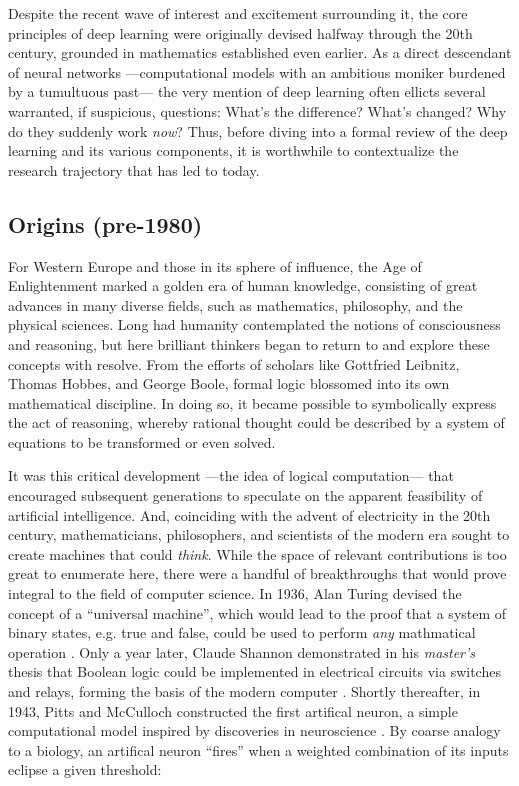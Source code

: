 Despite the recent wave of interest and excitement surrounding it, the core principles of deep learning were originally devised halfway through the 20th century, grounded in mathematics established even earlier.
As a direct descendant of neural networks ---computational models with an ambitious moniker burdened by a tumultuous past--- the very mention of deep learning often ellicts several warranted, if suspicious, questions: What's the difference? What's changed? Why do they suddenly work \emph{now}?
Thus, before diving into a formal review of the deep learning and its various components, it is worthwhile to contextualize the research trajectory that has led to today.


\subsection{Origins (pre-1980)}
\label{subsec:origins}

For Western Europe and those in its sphere of influence, the Age of Enlightenment marked a golden era of human knowledge, consisting of great advances in many diverse fields, such as mathematics, philosophy, and the physical sciences.
Long had humanity contemplated the notions of consciousness and reasoning, but here brilliant thinkers began to return to and explore these concepts with resolve.
From the efforts of scholars like Gottfried Leibnitz, Thomas Hobbes, and George Boole, formal logic blossomed into its own mathematical discipline.
In doing so, it became possible to symbolically express the act of reasoning, whereby rational thought could be described by a system of equations to be transformed or even solved.

It was this critical development ---the idea of logical computation--- that encouraged subsequent generations to speculate on the apparent feasibility of artificial intelligence.
And, coinciding with the advent of electricity in the 20th century, mathematicians, philosophers, and scientists of the modern era sought to create machines that could \emph{think}.
While the space of relevant contributions is too great to enumerate here, there were a handful of breakthroughs that would prove integral to the field of computer science.
In 1936, Alan Turing devised the concept of a ``universal machine'', which would lead to the proof that a system of binary states, e.g. true and false, could be used to perform \emph{any} mathmatical operation \cite{Turing1936}.
Only a year later, Claude Shannon demonstrated in his \emph{master's} thesis that Boolean logic could be implemented in electrical circuits via switches and relays, forming the basis of the modern computer \cite{Shannon1937}.
Shortly thereafter, in 1943, Pitts and McCulloch constructed the first artifical neuron, a simple computational model inspired by discoveries in neuroscience \cite{Pitts1943}.
By coarse analogy to a biology, an artifical neuron ``fires'' when a weighted combination of its inputs eclipse a given threshold:

